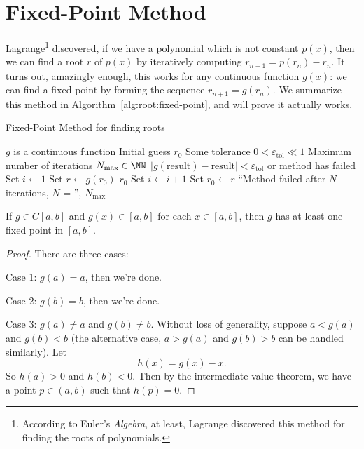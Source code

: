\section{Fixed-Point Method}

Lagrange\footnote{According to Euler's \emph{Algebra}, at least,
Lagrange discovered this method for finding the roots of polynomials.}
discovered, if we have a polynomial which is not constant $p(x)$, then
we can find a root $r$ of $p(x)$ by iteratively computing
$r_{n+1}=p(r_{n})-r_{n}$. It turns out, amazingly enough, this works for
any continuous function $g(x)$: we can find a fixed-point by forming the
sequence $r_{n+1}=g(r_{n})$. We summarize this method in
Algorithm~\ref{alg:root:fixed-point}, and will prove it actually works.

\begin{algorithm}\label{alg:root:fixed-point}
  \caption{Fixed-Point Method for finding roots}
  \begin{algorithmic}[1]
    \Require $g$ is a continuous function
    \Require Initial guess $r_{0}$
    \Require Some tolerance $0<\varepsilon_{\text{tol}}\ll1$
    \Require Maximum number of iterations $N_{\text{max}}\in\NN$
    \Ensure $|g(\mbox{result})-\mbox{result}|<\varepsilon_{\text{tol}}$
    or method has failed
    \State Set $i\gets 1$
      \State Set $r \gets g(r_{0})$
        \State\Return $r_{0}$
      \EndIf
      \State Set $i\gets i+1$
      \State Set $r_{0}\gets r$
    \EndWhile
    \State\Fail ``Method failed after $N$ iterations, $N$ = '', $N_{\text{max}}$
    \EndFunction
  \end{algorithmic}
\end{algorithm}

\begin{lemma}\label{lemma:root:fixed-point:existence}
  If $g\in C[a,b]$ and $g(x)\in[a,b]$ for each $x\in[a,b]$,
  then $g$ has at least one fixed point in $[a,b]$.
\end{lemma}
\begin{proof}
  There are three cases:

  Case 1: $g(a)=a$, then we're done.

  Case 2: $g(b)=b$, then we're done.

  Case 3: $g(a)\neq a$ and $g(b)\neq b$. Without loss of generality,
  suppose $a < g(a)$ and $g(b) < b$ (the alternative case, $a > g(a)$
  and $g(b) > b$ can be handled similarly). Let
  \begin{equation}
    h(x) = g(x)-x.
  \end{equation}
  So $h(a) > 0$ and $h(b) < 0$. Then by the intermediate value theorem,
  we have a point $p\in(a,b)$ such that $h(p)=0$.
\end{proof}


